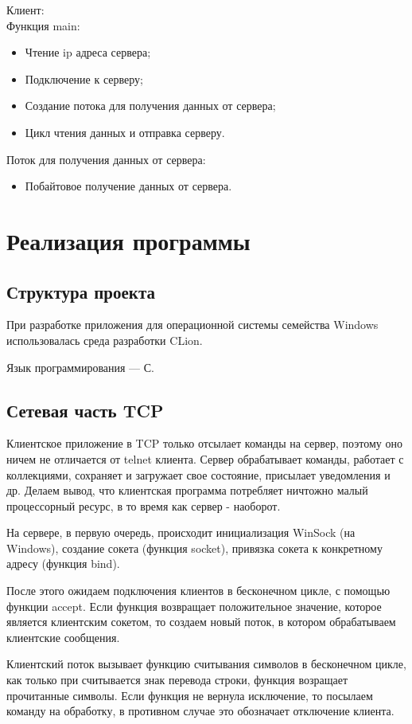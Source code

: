 \documentclass[a4paper,14pt]{article}
\begin{document}
Клиент:\\
Функция main:
	\begin{itemize}	
\item Чтение ip адреса сервера;
\item Подключение к серверу;
\item Создание потока для получения данных от сервера;
\item Цикл чтения данных и отправка серверу.
\end{itemize}
Поток для получения данных от сервера:
 \begin{itemize}
\item Побайтовое получение данных от сервера.
	\end{itemize}
\section{Реализация программы}
\subsection{Структура проекта}
При разработке приложения для операционной системы семейства Windows использовалась среда разработки CLion.

Язык программирования — С.

\subsection{Сетевая часть TCP}
Клиентское приложение в TCP только отсылает команды на сервер, поэтому оно ничем не отличается от telnet клиента. Сервер обрабатывает команды, работает с коллекциями, сохраняет и загружает свое состояние, присылает уведомления и др. Делаем вывод, что клиентская программа потребляет ничтожно малый процессорный ресурс, в то время как сервер - наоборот.

На сервере, в первую очередь, происходит инициализация WinSock (на Windows), создание сокета (функция socket), привязка сокета к конкретному адресу (функция bind). 

После этого ожидаем подключения клиентов в бесконечном цикле, с помощью функции accept. Если функция возвращает положительное значение, которое является клиентским сокетом, то создаем новый поток, в котором обрабатываем клиентские сообщения. 

Клиентский поток вызывает функцию считывания символов в бесконечном цикле, как только при считывается знак перевода строки, функция возращает прочитанные символы. Если функция не вернула исключение, то посылаем команду на обработку, в противном случае это обозначает отключение клиента. 
\end{document}
